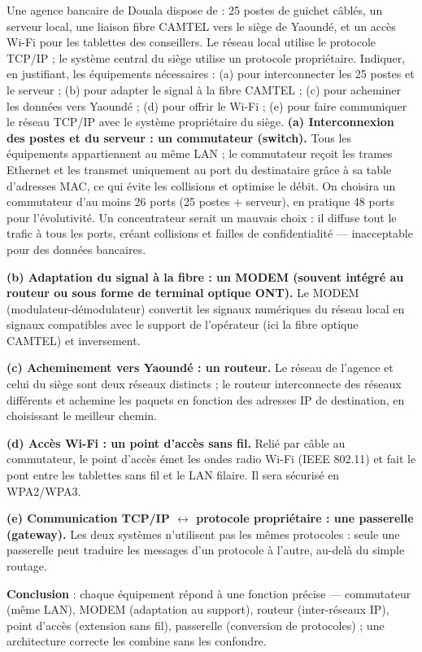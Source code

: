 \documentclass[11pt]{article}
\begin{document}
\begin{exoresolu}
Une agence bancaire de Douala dispose de : 25 postes de guichet câblés, un serveur local, une liaison fibre CAMTEL vers le siège de Yaoundé, et un accès Wi-Fi pour les tablettes des conseillers. Le réseau local utilise le protocole TCP/IP ; le système central du siège utilise un protocole propriétaire. Indiquer, en justifiant, les équipements nécessaires : (a) pour interconnecter les 25 postes et le serveur ; (b) pour adapter le signal à la fibre CAMTEL ; (c) pour acheminer les données vers Yaoundé ; (d) pour offrir le Wi-Fi ; (e) pour faire communiquer le réseau TCP/IP avec le système propriétaire du siège.
\tcblower
\textbf{(a) Interconnexion des postes et du serveur : un commutateur (switch).} Tous les équipements appartiennent au même LAN ; le commutateur reçoit les trames Ethernet et les transmet uniquement au port du destinataire grâce à sa table d'adresses MAC, ce qui évite les collisions et optimise le débit. On choisira un commutateur d'au moins 26 ports (25 postes + serveur), en pratique 48 ports pour l'évolutivité. Un concentrateur serait un mauvais choix : il diffuse tout le trafic à tous les ports, créant collisions et failles de confidentialité — inacceptable pour des données bancaires.

\textbf{(b) Adaptation du signal à la fibre : un MODEM (souvent intégré au routeur ou sous forme de terminal optique ONT).} Le MODEM (modulateur-démodulateur) convertit les signaux numériques du réseau local en signaux compatibles avec le support de l'opérateur (ici la fibre optique CAMTEL) et inversement.

\textbf{(c) Acheminement vers Yaoundé : un routeur.} Le réseau de l'agence et celui du siège sont deux réseaux distincts ; le routeur interconnecte des réseaux différents et achemine les paquets en fonction des adresses IP de destination, en choisissant le meilleur chemin.

\textbf{(d) Accès Wi-Fi : un point d'accès sans fil.} Relié par câble au commutateur, le point d'accès émet les ondes radio Wi-Fi (IEEE 802.11) et fait le pont entre les tablettes sans fil et le LAN filaire. Il sera sécurisé en WPA2/WPA3.

\textbf{(e) Communication TCP/IP $\leftrightarrow$ protocole propriétaire : une passerelle (gateway).} Les deux systèmes n'utilisent pas les mêmes protocoles : seule une passerelle peut traduire les messages d'un protocole à l'autre, au-delà du simple routage.

\textbf{Conclusion} : chaque équipement répond à une fonction précise — commutateur (même LAN), MODEM (adaptation au support), routeur (inter-réseaux IP), point d'accès (extension sans fil), passerelle (conversion de protocoles) ; une architecture correcte les combine sans les confondre.
\end{exoresolu}
\end{document}
